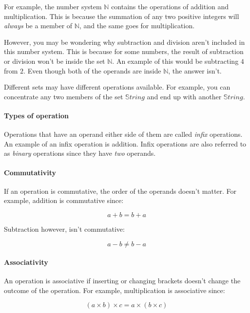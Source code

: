 For example, the number system $\mathbb{N}$ contains the operations of addition
and multiplication. This is because the summation of any two positive integers
will {\it always} be a member of $\mathbb{N}$, and the same goes for
multiplication.

However, you may be wondering why subtraction and division aren't included in
this number system. This is because for some numbers, the result of subtraction
or division won't be inside the set $\mathbb{N}$. An example of this would be
subtracting $4$ from $2$. Even though both of the operands are inside
$\mathbb{N}$, the answer isn't.

Different sets may have different operations available. For example, you can
concentrate any two members of the set $\mathbb{S}tring$ and end up with another
$\mathbb{S}tring$.

\paragraph{Types of operation} Operations that have an operand either side of
them are called {\it infix} operations. An example of an infix operation is
addition. Infix operations are also referred to as {\it binary} operations since
they have {\it two} operands.

\paragraph{Commutativity} If an operation is commutative, the order of the
operands doesn't matter. For example, addition is commutative since:

\begin{dmath}
	a + b = b + a
\end{dmath}

Subtraction however, isn't commutative:

\begin{dmath}
	a - b \neq b - a
\end{dmath}

\paragraph{Associativity}

An operation is associative if inserting or changing brackets doesn't change the
outcome of the operation. For example, multiplication is associative since:

\begin{dmath}
	(a \times b) \times c = a \times (b \times c)
\end{dmath}

